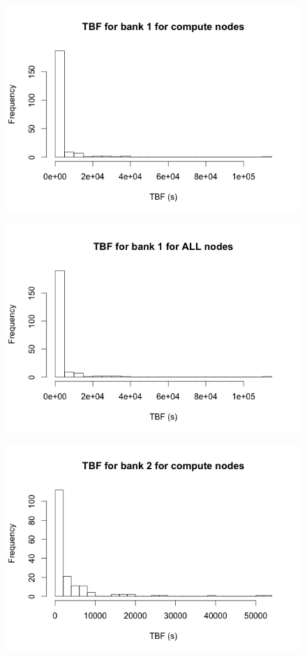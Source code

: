 \begin{figure}[h]
\centering
\includegraphics{images/tbf_1_c.png}
\end{figure}

\begin{figure}[h]
\centering
\includegraphics{images/tbf_1_a.png}
\end{figure}

\begin{figure}[h]
\centering
\includegraphics{images/tbf_2_c.png}
\end{figure}

